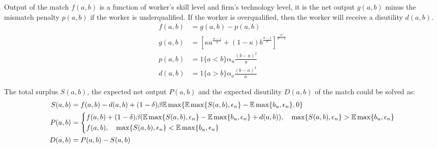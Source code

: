 \documentclass{article}
\newcommand{\E}{\mathbb{E}}
\newcommand{\1}{\mathbb{1}}
\begin{document}
Output of the match $f(a,b)$ is a function of worker's skill level and firm's technology level, it is the net output $g(a,b)$ minus the mismatch penalty $p(a,b)$ if the worker is underqualified. If the worker is overqualified, then the worker will receive a disutility $d(a,b)$. 
\begin{align*}
f(a,b) &= g(a,b)-p(a,b) \\
g(a,b) &= [\kappa a^{\frac{\sigma-1}{\sigma}}+(1-\kappa) b^{\frac{\sigma-1}{\sigma}}]^{\frac{\sigma}{\sigma-1}} \\
p(a,b) &= 1\{a<b\}\alpha_u\frac{(b-a)^2}{a}\\
d(a,b) &= 1\{a>b\}\alpha_o\frac{(b-a)^2}{a}
\end{align*}

The total surplus $S(a,b)$, the expected net output $P(a,b)$ and the expected disutility $D(a,b)$ of the match could be solved as: 
\begin{align*}
S(a,b) &= f(a,b)-d(a,b)+(1-\delta)\beta \E\max\{\E\max\{S(a,b),\epsilon_n\}-\E\max\{b_u,\epsilon_n\},0 \}  \\
P(a,b)
&= \begin{dcases}
f(a,b)+(1-\delta)\beta(\E\max\{S(a,b),\epsilon_n\}-\E\max\{b_u,\epsilon_n\}+d(a,b)), \quad  \max\{S(a,b),\epsilon_n\}>\E\max\{b_u,\epsilon_n\} \\
f(a,b), \quad \max\{S(a,b),\epsilon_n\}<\E\max\{b_u,\epsilon_n\}
\end{dcases} \\
D(a,b) &=P(a,b)-S(a,b)
\end{align*}
\end{document}
